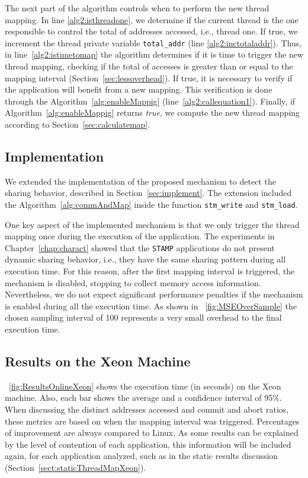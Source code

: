 The next part of the algorithm controls when to perform the new thread mapping. In line \ref{alg2:isthreadone}, we determine if the current thread is the one responsible to control the total of addresses accessed, i.e., thread one. If true, we increment the thread private variable \texttt{total\_addr} (line \ref{alg2:inctotaladdr}). Thus, in line~\ref{alg2:istimetomap} the algorithm determines if it is time to trigger the new thread mapping, checking if the total of accesses is greater than or equal to the mapping interval (Section~\ref{sec:lessoverhead}). If true, %
it is necessary to verify if the application will  benefit from a new mapping. This verification is done through the Algorithm~\ref{alg:enableMappig} (line~\ref{alg2:callequation1}). Finally, if Algorithm~\ref{alg:enableMappig} returns \emph{true}, we compute the new thread mapping according to Section~\ref{sec:calculatemap}.

\subsection{Implementation}\label{sec:onlineImplement}


We extended the implementation of the proposed mechanism to detect the sharing behavior, described in Section~\ref{sec:implement}. The extension included the Algorithm~\ref{alg:commAndMap} inside the function \texttt{stm\_write} and \texttt{stm\_load}.
%

One key aspect of the implemented mechanism is that we only trigger the thread mapping once during the execution of the application. The experiments in Chapter~\ref{chap:charact} showed that the \texttt{STAMP} applications do not present dynamic sharing behavior, i.e., they have the same sharing pattern during all execution time. For this reason, after the first mapping interval is triggered, the mechanism is disabled, stopping to collect memory access information. Nevertheless, we do not expect significant performance penalties if the mechanism is enabled during all the execution time. As shown in \figurename~\ref{fig:MSEOverSample} the chosen sampling interval of 100 represents a very small overhead to the final execution time.


\subsection{Results on the Xeon Machine}

\figurename~\ref{fig:ResultsOnlineXeon} shows the execution time (in seconds) on the Xeon machine. Also, each bar shows the average and a confidence interval of 95\%. When discussing the distinct addresses accessed and commit and abort ratios, these metrics are based on when the mapping interval was triggered. Percentages of improvement are always compared to Linux. As some results can be explained by the level of contention of each application, this information will be included again, for each application analyzed, such as in the static results discussion (Section~\ref{sect:staticThreadMapXeon}).

